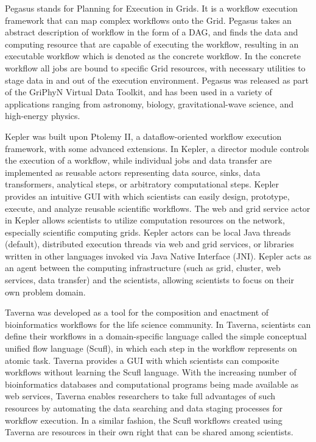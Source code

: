 Pegasus stands for Planning for Execution in Grids. It is a workflow execution framework that can map complex workflows onto the Grid. Pegasus takes an abstract description of workflow in the form of a DAG, and finds the data and computing resource that are capable of executing the workflow, resulting in an executable workflow which is denoted as the concrete workflow. In the concrete workflow all jobs are bound to specific Grid resources, with necessary utilities to stage data in and out of the execution environment. Pegasus was released as part of the GriPhyN Virtual Data Toolkit, and has been used in a variety of applications ranging from astronomy, biology, gravitational-wave science, and high-energy physics.

Kepler was built upon Ptolemy II, a dataflow-oriented workflow execution framework, with some advanced extensions. In Kepler, a director module controls the execution of a workflow, while individual jobs and data transfer are implemented as reusable actors representing data source, sinks, data transformers, analytical steps, or arbitratory computational steps. Kepler provides an intuitive GUI with which scientists can easily design, prototype, execute, and analyze reusable scientific workflows. The web and grid service actor in Kepler allows scientists to utilize computation resources on the network, especially scientific computing grids. Kepler actors can be local Java threads (default), distributed execution threads via web and grid services, or libraries written in other languages invoked via Java Native Interface (JNI). Kepler acts as an agent between the computing infrastructure (such as grid, cluster, web services, data transfer) and the scientists, allowing scientists to focus on their own problem domain. 

Taverna was developed as a tool for the composition and enactment of bioinformatics workflows for the life science community. In Taverna, scientists can define their workflows in a domain-specific language called the simple conceptual unified flow language (Scufl), in which each step in the workflow represents on atomic task. Taverna provides a GUI with which scientists can composite workflows without learning the Scufl language. With the increasing number of bioinformatics databases and computational programs being made available as web services, Taverna enables researchers to take full advantages of such resources by automating the data searching and data staging processes for workflow execution. In a similar fashion, the Scufl workflows created using Taverna are resources in their own right that can be shared among scientists. 

